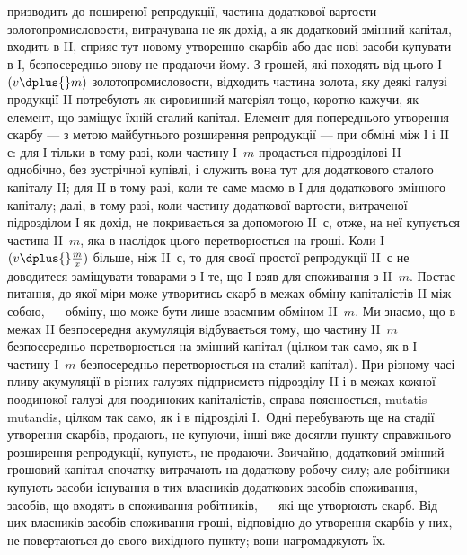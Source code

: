 \parcont{}  %
призводить до поширеної репродукції, частина додаткової вартости золотопромисловости,
витрачувана не як дохід, а як додатковий змінний
капітал, входить в II, сприяє тут новому утворенню скарбів або дає нові
засоби купувати в І, безпосередньо знову не продаючи йому. З грошей,
які походять від цього І~$(v \dplus{} m)$ золотопромисловости, відходить частина
золота, яку деякі галузі продукції II потребують як сировинний матеріял
тощо, коротко кажучи, як елемент, що заміщує їхній сталий капітал.
Елемент для попереднього утворення скарбу — з метою майбутнього розширення
репродукції — при обміні між І і II є: для І тільки в тому разі,
коли частину І~$m$ продається підрозділові II однобічно, без зустрічної
купівлі, і служить вона тут для додаткового сталого капіталу II; для II
в тому разі, коли те саме маємо в І для додаткового змінного капіталу;
далі, в тому разі, коли частину додаткової вартости, витраченої підрозділом
І як дохід, не покривається за допомогою II~$с$, отже, на неї купується
частина II~$m$, яка в наслідок цього перетворюється на гроші. Коли
I~$(v \dplus{} \frac{m}{x})$ більше, ніж II~$с$, то для своєї простої репродукції II~$с$ не
доводитеся заміщувати товарами з І те, що І взяв для споживання з II~$m$.
Постає питання, до якої міри може утворитись скарб в межах обміну
капіталістів II між собою, — обміну, що може бути лише взаємним
обміном II~$m$. Ми знаємо, що в межах II безпосередня акумуляція відбувається
тому, що частину II~$m$ безпосередньо перетворюється на змінний
капітал (цілком так само, як в І частину I~$m$ безпосередньо перетворюється
на сталий капітал). При різному часі пливу акумуляції в різних галузях
підприємств підрозділу II і в межах кожної поодинокої галузі для поодиноких
капіталістів, справа пояснюється, mutatis mutandis, цілком так само,
як і в підрозділі І.~Одні перебувають ще на стадії утворення скарбів,
продають, не купуючи, інші вже досягли пункту справжнього розширення
репродукції, купують, не продаючи. Звичайно, додатковий змінний грошовий
капітал спочатку витрачають на додаткову робочу силу; але робітники
купують засоби існування в тих власників додаткових засобів
споживання, — засобів, що входять в споживання робітників, — які ще
утворюють скарб. Від цих власників засобів споживання гроші, відповідно
до утворення скарбів у них, не повертаються до свого вихідного
пункту; вони нагромаджують їх.
\label{original-409}
